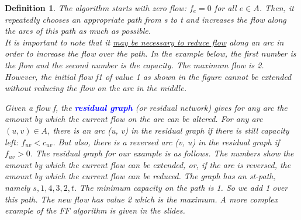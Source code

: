 \documentclass[10pt]{report}
\numberwithin{dummy}{section}
\theoremstyle{ocrenumbox}
\theoremstyle{grayman}
\newtheorem{definitionTTTT}{Definition}[]
\newenvironment{voc}{\begin{vBox}\begin{definitionTTTT}}{\end{definitionTTTT}\end{vBox}}
\begin{document}
\begin{voc}
    The algorithm starts with zero flow: $f_e = 0$ for all $e \in A$. Then, it repeatedly chooses an appropriate path from s to t and increases the flow along the arcs
of this path as much as possible.\\ 
It is important to note that it \underline{may be necessary to reduce flow} along an arc
in order to increase the flow over the path. In the example below, the first
number is the flow and the second number is the capacity. The maximum
flow is 2. However, the initial flow f1 of value 1 as shown in the figure cannot
be extended without reducing the flow on the arc in the middle.
\begin{center}
\end{center}
Given a flow f, the \textbf{\textcolor{blue}{residual graph}} (or residual network) gives for any arc
the amount by which the current flow on the arc can be altered. For any arc
$(u, v) \in A$, there is an arc (u, v) in the residual graph if there is still capacity
left: $f_{uv} < c_{uv}$. But also, there is a reversed arc (v, u) in the residual graph
if $f_{uv} > 0$. The residual graph for our example is as follows. The numbers show the amount by which the current flow can be extended, or, if the arc is reversed, the amount by which the current flow can be reduced. The graph
has an st-path, namely $s, 1, 4, 3, 2, t.$ The minimum capacity on the path is 1. So we add 1 over this path. The new flow has value 2 which is the
maximum. A more complex example of the FF algorithm is given in the slides.
\begin{center}
    \begin{tikzpicture} [node distance = 3cm, on grid, auto,every state/.style = {draw = black, fill = white!10,minimum size=0.4cm}]
 

\end{tikzpicture}
\end{center}
\end{voc}
\end{document}
